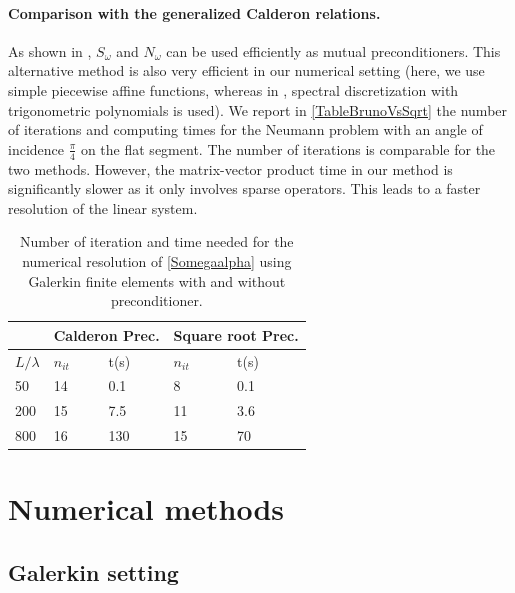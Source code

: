 \documentclass[a4paper]{article}
\begin{document}
\paragraph{Comparison with the generalized Calderon relations.} As shown in \cite{bruno2012second}, $S_\omega$ and $N_\omega$ can be used efficiently as mutual preconditioners. This alternative method is also very efficient in our numerical setting (here, we use simple piecewise affine functions, whereas in \cite{bruno2012second}, spectral discretization with trigonometric polynomials is used). We report in \autoref{TableBrunoVsSqrt} the number of iterations and computing times for the Neumann problem with an angle of incidence $\frac{\pi}{4}$ on the flat segment. The number of iterations is comparable for the two methods. However, the matrix-vector product time in our method is significantly slower as it only involves sparse operators. This leads to a faster resolution of the linear system. 

\begin{table}[H]
	\begin{center}
		\begin{tabular}{|| m{4em} | m{4em} | m{4em} | m{4em} | m{4em}||} 
			\hline
			\multicolumn{1}{||c|}{ }&
			\multicolumn{2}{c|}{Calderon Prec.}&\multicolumn{2}{c||}{Square root Prec.}\\
			\hline
			$L/\lambda$ & $n_{it}$& t(s) & $n_{it}$ & t(s)\\
			\hline\hline
			50 & 14 & 0.1 & 8 & 0.1\\
			\hline
			200 & 15 & 7.5 & 11 &  3.6\\
			\hline
			800 & 16 & 130 & 15 & 70\\
			\hline
		\end{tabular}
	\end{center}
	\caption{Number of iteration and time needed for the numerical resolution of \eqref{Somegaalpha} using Galerkin finite elements with and without preconditioner.}
	\label{TableBrunoVsSqrt}
\end{table}
	
\section{Numerical methods}
\label{sec:numerMeth}

\subsection{Galerkin setting}
\end{document}

